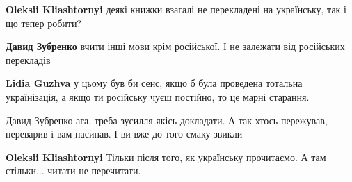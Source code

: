 \begin{flushright}
\begin{minipage}{0.8\textwidth}

 
\textbf{Oleksii Kliashtornyi} деякі книжки взагалі не перекладені на українську, так і що тепер робити?

 
\textbf{Давид Зубренко} вчити інші мови крім російської. І не залежати від російських перекладів

 
\textbf{Lidia Guzhva} у цьому був би сенс, якщо б була проведена тотальна українізація, а якщо ти російську чуєш постійно, то це марні старання.

 
Давид Зубренко ага, треба зусилля якісь докладати. А так хтось пережував, переварив і вам насипав. І ви вже до того смаку звикли

 
\textbf{Oleksii Kliashtornyi} Тільки після того, як українську прочитаємо. А там стільки... читати не перечитати.

 

\end{minipage}
\end{flushright}
